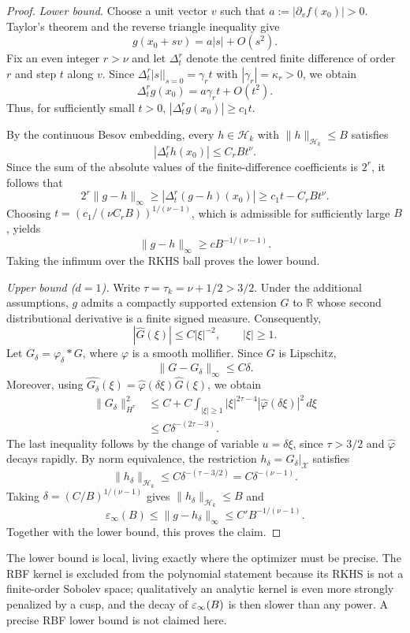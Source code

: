 \begin{proof}
\emph{Lower bound.}
Choose a unit vector $v$ such that
$a:=|\partial_v f(x_0)|>0$. Taylor's theorem and the
reverse triangle inequality give
\[
g(x_0+sv)=a|s|+O(s^2).
\]
Fix an even integer $r>\nu$ and let $\Delta_t^r$ denote
the centred finite difference of order $r$ and step $t$
along $v$. Since
$\Delta_t^r|s||_{s=0}=\gamma_r t$ with
$|\gamma_r|=\kappa_r>0$, we obtain
\[
\Delta_t^r g(x_0)=a\gamma_r t+O(t^2).
\]
Thus, for sufficiently small $t>0$,
$|\Delta_t^r g(x_0)|\ge c_1t$.

By the continuous Besov embedding, every
$h\in\mathcal H_k$ with $\|h\|_{\mathcal H_k}\le B$
satisfies
\[
|\Delta_t^r h(x_0)|\le C_rBt^\nu.
\]
Since the sum of the absolute values of the finite-difference
coefficients is $2^r$, it follows that
\[
2^r\|g-h\|_\infty
\ge |\Delta_t^r(g-h)(x_0)|
\ge c_1t-C_rBt^\nu.
\]
Choosing
$t=(c_1/(\nu C_rB))^{1/(\nu-1)}$,
which is admissible for sufficiently large $B$, yields
\[
\|g-h\|_\infty\ge cB^{-1/(\nu-1)}.
\]
Taking the infimum over the RKHS ball proves the lower bound.

\emph{Upper bound ($d=1$).}
Write $\tau=\tau_k=\nu+1/2>3/2$.
Under the additional assumptions, $g$ admits a compactly
supported extension $G$ to $\mathbb R$ whose second
distributional derivative is a finite signed measure.
Consequently,
\[
|\widehat G(\xi)|\le C|\xi|^{-2},
\qquad |\xi|\ge1.
\]
Let $G_\delta=\varphi_\delta*G$, where $\varphi$ is a
smooth mollifier. Since $G$ is Lipschitz,
\[
\|G-G_\delta\|_\infty\le C\delta.
\]
Moreover, using
$\widehat{G_\delta}(\xi)
=\widehat\varphi(\delta\xi)\widehat G(\xi)$,
we obtain
\[
\begin{aligned}
\|G_\delta\|_{H^\tau}^2
&\le C+
C\int_{|\xi|\ge1}
|\xi|^{2\tau-4}
|\widehat\varphi(\delta\xi)|^2\,d\xi\\
&\le C\delta^{-(2\tau-3)}.
\end{aligned}
\]
The last inequality follows by the change of variable
$u=\delta\xi$, since $\tau>3/2$ and
$\widehat\varphi$ decays rapidly.
By norm equivalence, the restriction
$h_\delta=G_\delta|_{\mathcal X}$ satisfies
\[
\|h_\delta\|_{\mathcal H_k}
\le C\delta^{-(\tau-3/2)}
=C\delta^{-(\nu-1)}.
\]
Taking $\delta=(C/B)^{1/(\nu-1)}$ gives
$\|h_\delta\|_{\mathcal H_k}\le B$ and
\[
\varepsilon_\infty(B)
\le\|g-h_\delta\|_\infty
\le C'B^{-1/(\nu-1)}.
\]
Together with the lower bound, this proves the claim.
\end{proof}


\begin{remark}
The lower bound is local, living exactly where the optimizer must be precise. The
RBF kernel is excluded from the polynomial statement because its RKHS is not a
finite-order Sobolev space; qualitatively an analytic kernel is even more strongly
penalized by a cusp, and the decay of $\varepsilon_{\infty}(B)$ is then slower than any power.
A precise RBF lower bound is not claimed here.
\end{remark}

